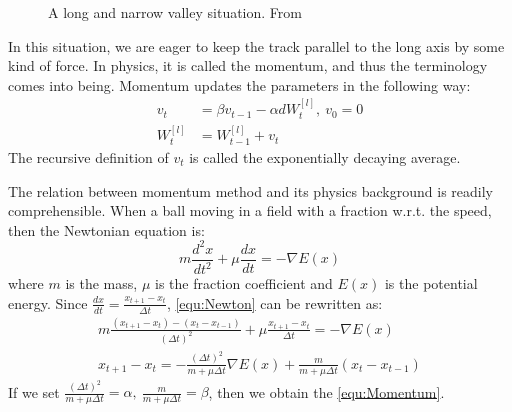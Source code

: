 \begin{figure}[H]
    \centering
    \centering
    \caption{\label{fig:valley}A long and narrow valley 
    situation. From \parencite{momentum}}
\end{figure}

In this situation, we are eager to keep the track
parallel to the long axis by some kind of force. In physics, it is called
the momentum, and thus the terminology comes into being. Momentum updates
the parameters in the following way:
\begin{equation}
    \label{equ:Momentum}
    \begin{split}
        v_{t} & = \beta v_{t-1} - \alpha dW_t^{[l]},\ v_0 = 0 \\
        W_t^{[l]} & = W_{t-1}^{[l]} + v_{t}
    \end{split}
\end{equation}
The recursive definition of $ v_t $ is called the exponentially decaying average.
\par The relation between momentum method and its physics background is readily
comprehensible. When a ball moving in a field with
a fraction w.r.t. the speed, then the Newtonian equation is:
\begin{equation}
    \label{equ:Newton}
    m\frac{d^2x}{dt^2} + \mu\frac{dx}{dt} = -\nabla E(x)
\end{equation}
where $ m $ is the mass, $ \mu $ is the fraction coefficient and $ E(x) $
is the potential energy. Since 
$ \frac{dx}{dt} = \frac{x_{t+1} - x_{t}}{\Delta t} $, \autoref{equ:Newton}
can be rewritten as:
\begin{equation}
    \label{equ:physics}
    \begin{split}
        m\frac{(x_{t+1} - x_{t}) - (x_{t} - x_{t-1})}{(\Delta t)^2} + \mu\frac{x_{t+1} - x_{t}}{\Delta t} = -\nabla E(x) \\
        x_{t+1} - x_{t} = -\frac{(\Delta t)^2}{m+\mu\Delta t}\nabla E(x) + \frac{m}{m+\mu\Delta t}(x_{t} - x_{t-1})
    \end{split}
\end{equation}
If we set $ \frac{(\Delta t)^2}{m+\mu\Delta t} = \alpha,\ 
\frac{m}{m+\mu\Delta t} = \beta $, then we obtain the \autoref{equ:Momentum}.

